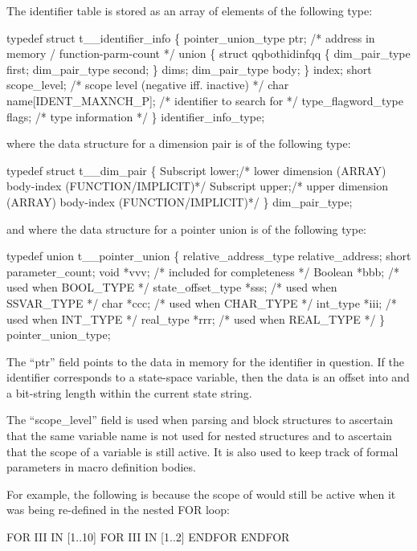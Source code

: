 The identifier table is stored as an array of elements of the following type:
\begin{codeexample}
typedef struct t__identifier_info
  \{
     pointer_union_type ptr;    /* address in memory / function-parm-count */
     union
        \{
           struct qqbothidinfqq
              \{
                 dim_pair_type first;
                 dim_pair_type second;
              \} dims;
           dim_pair_type body;
        \} index;
     short scope_level;         /* scope level (negative iff. inactive) */
     char name[IDENT_MAXNCH_P]; /* identifier to search for */
     type_flagword_type flags;  /* type information */
  \} identifier_info_type;
\end{codeexample}
where the data structure for a dimension pair is of the following type:
\begin{codeexample}
typedef struct t__dim_pair
  \{
    Subscript lower;/* lower dimension (ARRAY) body-index (FUNCTION/IMPLICIT)*/
    Subscript upper;/* upper dimension (ARRAY) body-index (FUNCTION/IMPLICIT)*/
  \} dim_pair_type;
\end{codeexample}

and where the data structure for a pointer union is of the following type:
\begin{codeexample}
typedef union t__pointer_union
   \{
     relative_address_type relative_address;
     short parameter_count;
     void *vvv;               /* included for completeness */
     Boolean *bbb;            /* used when BOOL_TYPE */
     state_offset_type *sss;  /* used when SSVAR_TYPE */
     char *ccc;               /* used when CHAR_TYPE */
     int_type *iii;           /* used when INT_TYPE */
     real_type *rrr;          /* used when REAL_TYPE */
   \} pointer_union_type;
\end{codeexample}



The ``ptr'' field points to the data in memory for the identifier in question.
If the identifier corresponds to a state-space variable, then the data is 
an offset into and a bit-string length within the current state string.

The ``scope\_level'' field is used when parsing  and block
 structures to
ascertain that the same variable name is not used for nested
structures and to ascertain that the scope of a variable is still active.  It
is also used to keep track of formal parameters in macro definition bodies.

For example, the following is 
because the scope of  would still be active when it was
being re-defined in the nested FOR loop:
\begin{codeexample}
FOR III IN [1..10]
    FOR III IN [1..2]
    ENDFOR
ENDFOR
\end{codeexample}

